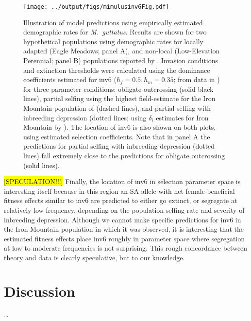 \documentclass[11pt]{article}
\begin{document}
\begin{figure}[htbp]
 \centering
 \texttt{[image: ../output/figs/mimulusinv6Fig.pdf]}
 \caption{\footnotesize{Illustration of model predictions using empirically estimated demographic rates for {\itshape M.~guttatus}. Results are shown for two hypothetical populations using demographic rates for locally adapted (Eagle Meadows; panel A), and non-local (Low-Elevation Perennial; panel B) populations reported by \citet{PetersonEtAl2016}. Invasion conditions and extinction thresholds were calculated using the dominance coefficients estimated for inv6 ($h_f = 0.5, h_m = 0.35$; from data in \citealt{LeeKelly2015}) for three parameter conditions: obligate outcrossing (solid black lines), partial selfing using the highest field-estimate for the Iron Mountain population of \citet{Willis1993} (dashed lines), and partial selfing with inbreeding depression (dotted lines; using $\delta_i$ estimates for Iron Mountain by \citealt{Willis1993}). The location of inv6 is also shown on both plots, using estimated selection coefficients. Note that in panel A the predictions for partial selfing with inbreeding depression (dotted lines) fall extremely close to the predictions for obligate outcrossing (solid lines).}} 
 \label{fig:mimulusFig}
 \end{figure}


\hl{[SPECULATION!!!]} Finally, the location of inv6 in selection parameter space is interesting itself because in this region an SA allele with net female-beneficial fitness effects similar to inv6 are predicted to either go extinct, or segregate at relatively low frequency, depending on the population selfing-rate and severity of inbreeding depression. Although we cannot make specific predictions for inv6 in the Iron Mountain population in which it was observed, it is interesting that the estimated fitness effects place inv6 roughly in parameter space where segregation at low to moderate frequencies is not surprising. This rough concordance between theory and data is clearly speculative, but to our knowledge. 




\section*{Discussion}

\ldots 



 
\end{document}
